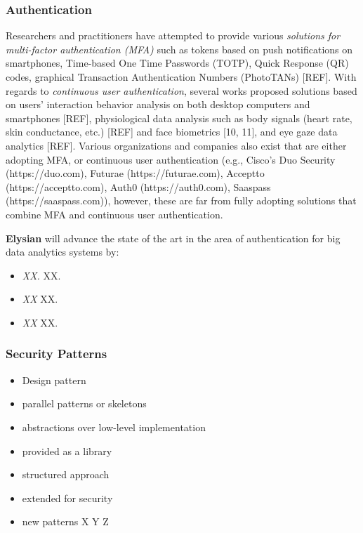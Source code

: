\documentclass[a4paper,11pt]{article}
\newcommand{\project}[1]{\textbf{#1}\xspace}
\newcommand{\SECURITY}{\project{Elysian}}
\newcommand{\TheProject}{\SECURITY}
\begin{document}
\subsubsection{Authentication}
\label{sect:auth}

Researchers and practitioners have attempted to provide various \textit{solutions for multi-factor authentication (MFA)} such as tokens based on push notifications on smartphones, Time-based One Time Passwords (TOTP), Quick Response (QR) codes, graphical Transaction Authentication Numbers (PhotoTANs) [REF]. With regards to \textit{continuous user authentication}, several works proposed solutions based on users’ interaction behavior analysis on both desktop computers and smartphones [REF], physiological data analysis such as body signals (heart rate, skin conductance, etc.) [REF] and face biometrics [10, 11], and eye gaze data analytics [REF]. Various organizations and companies also exist that are either adopting MFA, or continuous user authentication (e.g., Cisco’s Duo Security (https://duo.com), Futurae (https://futurae.com), Acceptto (https://acceptto.com), Auth0 (https://auth0.com), Saaspass (https://saaspass.com)), however, these are far from fully adopting solutions that combine MFA and continuous user authentication. 

\begin{mdframed}[backgroundcolor=gray!10]
\TheProject{} will advance the state of the art in the area of authentication for big data analytics systems by:
\begin{itemize}
\item \emph{XX.} XX.
\item \emph{XX} XX.
\item \emph{XX} XX.
\end{itemize}
\end{mdframed}

\subsubsection{Security Patterns}


\begin{itemize}
	\item Design pattern
	\item parallel patterns or skeletons
	\item abstractions over low-level implementation
	\item provided as a library
	\item structured approach
	\item extended for security
	\item new patterns X Y Z
\end{itemize}
\end{document}
